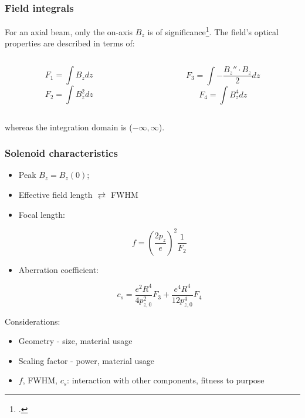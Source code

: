 \documentclass[10pt]{beamer}
\newcommand{\rfn}{\setcounter{footnote}{0}}
\begin{document}
\begin{frame}
  \rfn
  \frametitle{Field integrals}
  For an axial beam, only the on-axis $B_z$ is of significance\footcite{Disser}. The field's optical properties are described in terms of:
  \begin{columns}
    \begin{column}{0.5\textwidth}
      \begin{center}
      \begin{small}
        \[F_1 = \int B_z dz\]
        \[F_2 = \int B_z^2 dz\]
      \end{small}
      \end{center}
    \end{column}
    \begin{column}{0.5\textwidth}
      \begin{center}
      \begin{small}
      \[F_3 = \int - \frac{B_z''\cdot B_z}{2} dz \]
      \[F_4 = \int B_z^4 dz\]
      \end{small}
      \end{center}
    \end{column}
  \end{columns}
  \vspace{1cm}
  whereas the integration domain is ($-\infty,\infty$).
\end{frame}

\begin{frame}
  \rfn
  \frametitle{Solenoid characteristics}
    \begin{itemize}
      \item Peak $B_z = B_z(0)$;
      \item Effective field length $\rightleftarrows$ FWHM
      \item Focal length:\\
      \begin{small}
        \[
        f = \left(\frac{2p_z}{e}\right)^2\frac{1}{F_2}
        \]
      \end{small}
      \item Aberration coefficient:\\
      \begin{small}
        \[
        c_s = \frac{e^{2}R^{4}}{4p_{z,0}^{2}}F_{3}+\frac{e^{4}R^{4}}{12p_{z,0}^{4}}F_{4}
        \]
      \end{small}
    \end{itemize}
    \vspace{0.5cm}
    Considerations:
    \begin{itemize}
      \item Geometry - size, material usage
      \item Scaling factor - power, material usage
      \item $f$, FWHM, $c_s$: interaction with other components, fitness to purpose
    \end{itemize}
\end{frame}
\end{document}
